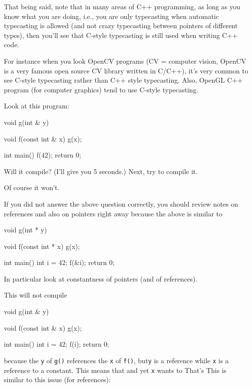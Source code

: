 That being said, note that in many areas of C++ programming, as long as you know what you are doing, i.e., you are only typecasting when automatic typecasting is allowed (and not crazy typecasting between pointers of different types), then you'll see that C-style typecasting is still used when writing C++ code.

For instance when you look OpenCV programs (CV = computer vision, OpenCV is a very famous open source CV library written in C/C++), it's very common to see C-style typecasting rather than C++ style typecasting. Also, OpenGL C++ program (for computer graphics) tend to use C-style typecasting.

\newpage{}

Look at this program:

\begin{console}
void g(int & y)
{}

void f(const int & x)
{   
    g(x);
}

int main()
{   
    f(42);
    return 0;
}
\end{console}

Will it compile? (I'll give you 5 seconds.) Next, try to compile it.

Of course it won't.

If you did not answer the above question correctly, you should review
notes on references and also on pointers right away because the above is
similar to
\begin{console}
void g(int * y)
{}

void f(const int * x)
{    
     g(x);
}

int main()
{   
    int i = 42;
    f(&i);
    return 0;
}
\end{console}


In particular look at constantness of pointers (and of references).

This will not compile

\begin{console}
void g(int & y)
{}

void f(const int & x)
{    
     g(x);
}

int main()
{   
    int i = 42;
    f(i);
    return 0;
}
\end{console}


because the \texttt{y} of \texttt{g()} references the \texttt{x} of
\texttt{f()}, but\texttt{y} is a reference while \texttt{x} is a reference to
a constant. This means that  and yet \texttt{x} wants to  That's  This is similar to this issue (for references):

